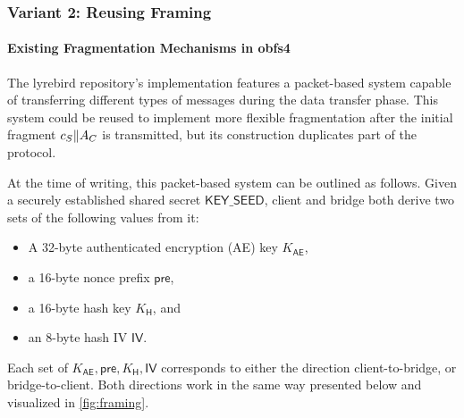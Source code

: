 \subsubsection{Variant 2: Reusing \obfsfour{} Framing} \label{sssec:variant-framing}

\paragraph{Existing Fragmentation Mechanisms in obfs4}
The lyrebird repository's \obfsfour{} implementation features a packet-based system capable of transferring different types of messages during the data transfer phase. This system could be reused to implement more flexible fragmentation after the initial fragment $c_S \| A_C$ is transmitted, but its construction duplicates part of the \drivel{} protocol.

At the time of writing, this packet-based system can be outlined as follows. Given a securely established shared secret $\mathsf{KEY\_SEED}$, client and bridge both derive two sets of the following values from it:
\begin{itemize}
    \item A 32-byte authenticated encryption (AE) key $K_\mathsf{AE}$,
    \item a 16-byte nonce prefix $\mathsf{pre}$,
    \item a 16-byte hash key $K_\mathsf{H}$, and
    \item an 8-byte hash IV $\mathsf{IV}$.
\end{itemize}

Each set of $K_\mathsf{AE}, \mathsf{pre}, K_\mathsf{H}, \mathsf{IV}$ corresponds to either the direction client-to-bridge, or bridge-to-client. Both directions work in the same way presented below and visualized in \cref{fig:framing}.

